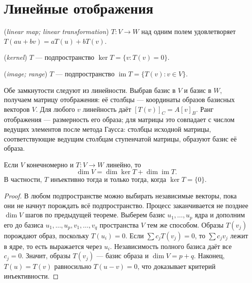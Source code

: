 \section{Линейные отображения}
\begin{definition} (\emph{linear map; linear transformation}) \(T:V\to W\) над одним полем удовлетворяет \(T(au+bv)=aT(u)+bT(v)\).\end{definition}
\begin{definition} (\emph{kernel}) \(T\) — подпространство \(\ker T=\{v:T(v)=0\}\).\end{definition}
\begin{definition} (\emph{image; range}) \(T\) — подпространство \(\operatorname{im}T=\{T(v):v\in V\}\).\end{definition}
Обе замкнутости следуют из линейности. Выбрав базис в \(V\) и базис в \(W\), получаем матрицу отображения: её столбцы — координаты образов базисных векторов \(V\). Для любого \(v\) линейность даёт \([T(v)]_C=A[v]_B\). Ранг отображения — размерность его образа; для матрицы это совпадает с числом ведущих элементов после метода Гаусса: столбцы исходной матрицы, соответствующие ведущим столбцам ступенчатой матрицы, образуют базис её образа.

\begin{theorem}\label{thm:legacy-c26-4}
Если \(V\) конечномерно и \(T:V\to W\) линейно, то
\[
\dim V=\dim\ker T+\dim\operatorname{im}T.
\]
В частности, \(T\) инъективно тогда и только тогда, когда \(\ker T=\{0\}\).
\end{theorem}
\begin{proof}
В любом подпространстве можно выбирать независимые векторы, пока они не начнут порождать всё подпространство. Процесс заканчивается не позднее \(\dim V\) шагов по предыдущей теореме. Выберем базис \(u_1,\ldots,u_p\) ядра и дополним его до базиса \(u_1,\ldots,u_p,v_1,\ldots,v_q\) пространства \(V\) тем же способом. Образы \(T(v_j)\) порождают образ, поскольку \(T(u_i)=0\). Если \(\sum c_jT(v_j)=0\), то \(\sum c_jv_j\) лежит в ядре, то есть выражается через \(u_i\). Независимость полного базиса даёт все \(c_j=0\). Значит, образы \(T(v_j)\) — базис образа и \(\dim V=p+q\). Наконец, \(T(u)=T(v)\) равносильно \(T(u-v)=0\), что доказывает критерий инъективности.
\end{proof}

